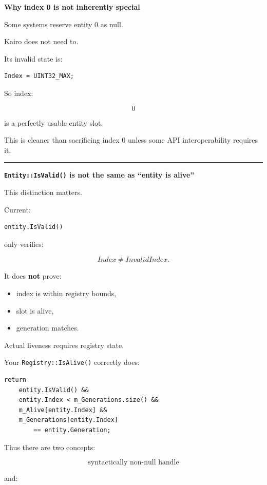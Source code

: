 \textbf{Why index 0 is not inherently special}

Some systems reserve entity 0 as null.

Kairo does not need to.

Its invalid state is:

\begin{verbatim}
Index = UINT32_MAX;
\end{verbatim}

So index:

\[
0
\]

is a perfectly usable entity slot.

This is cleaner than sacrificing index 0 unless some API interoperability requires it.

\begin{center}\rule{0.5\linewidth}{0.5pt}\end{center}

\textbf{\texttt{Entity::IsValid()} is not the same as ``entity is alive''}

This distinction matters.

Current:

\begin{verbatim}
entity.IsValid()
\end{verbatim}

only verifies:

\[
Index\neq InvalidIndex.
\]

It does \textbf{not} prove:

\begin{itemize}
\tightlist
\item
  index is within registry bounds,
\item
  slot is alive,
\item
  generation matches.
\end{itemize}

Actual liveness requires registry state.

Your \texttt{Registry::IsAlive()} correctly does:

\begin{verbatim}
return
    entity.IsValid() &&
    entity.Index < m_Generations.size() &&
    m_Alive[entity.Index] &&
    m_Generations[entity.Index]
        == entity.Generation;
\end{verbatim}

Thus there are two concepts:

\[
\boxed{
\text{syntactically non-null handle}
}
\]

and:

